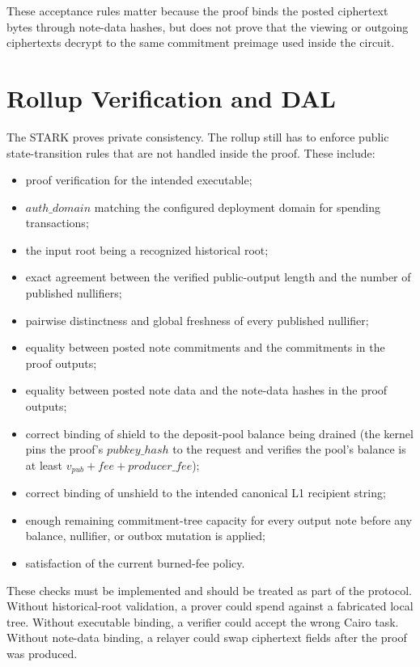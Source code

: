 \documentclass[11pt]{article}
\begin{document}
These acceptance rules matter because the proof binds the posted ciphertext
bytes through note-data hashes, but does not prove that the viewing or outgoing
ciphertexts decrypt to the same commitment preimage used inside the circuit.

\section{Rollup Verification and DAL}

The STARK proves private consistency. The rollup still has to enforce public
state-transition rules that are not handled inside the proof. These include:

\begin{itemize}
  \item proof verification for the intended executable;
  \item \(auth\_domain\) matching the configured deployment domain for
        spending transactions;
  \item the input root being a recognized historical root;
  \item exact agreement between the verified public-output length and the
        number of published nullifiers;
  \item pairwise distinctness and global freshness of every published
        nullifier;
  \item equality between posted note commitments and the commitments in the
        proof outputs;
  \item equality between posted note data and the note-data hashes in the
        proof outputs;
  \item correct binding of shield to the deposit-pool balance being drained
        (the kernel pins the proof's \(pubkey\_hash\) to the request and
        verifies the pool's balance is at least
        \(v_{pub} + fee + producer\_fee\));
  \item correct binding of unshield to the intended canonical L1 recipient
        string;
  \item enough remaining commitment-tree capacity for every output note before
        any balance, nullifier, or outbox mutation is applied;
  \item satisfaction of the current burned-fee policy.
\end{itemize}

These checks must be implemented and should be treated as part of the protocol.
Without historical-root validation, a prover could spend against a fabricated local
tree. Without executable binding, a verifier could accept the wrong Cairo task.
Without note-data binding, a relayer could swap ciphertext fields after the
proof was produced.
\end{document}
